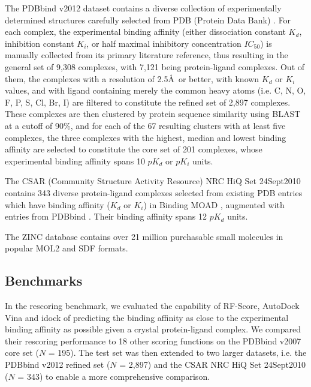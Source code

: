 The PDBbind v2012 dataset contains a diverse collection of experimentally determined structures carefully selected from PDB (Protein Data Bank) \citep{540,537}. For each complex, the experimental binding affinity (either dissociation constant $K_d$, inhibition constant $K_i$, or half maximal inhibitory concentration $IC_{50}$) is manually collected from its primary literature reference, thus resulting in the general set of 9,308 complexes, with 7,121 being protein-ligand complexes. Out of them, the complexes with a resolution of 2.5\AA\ or better, with known $K_d$ or $K_i$ values, and with ligand containing merely the common heavy atoms (i.e. C, N, O, F, P, S, Cl, Br, I) are filtered to constitute the refined set of 2,897 complexes. These complexes are then clustered by protein sequence similarity using BLAST at a cutoff of 90\%, and for each of the 67 resulting clusters with at least five complexes, the three complexes with the highest, median and lowest binding affinity are selected to constitute the core set of 201 complexes, whose experimental binding affinity spans 10 $pK_d$ or $pK_i$ units.

The CSAR (Community Structure Activity Resource) NRC HiQ Set 24Sept2010 contains 343 diverse protein-ligand complexes selected from existing PDB \citep{540,537} entries which have binding affinity ($K_d$ or $K_i$) in Binding MOAD \citep{517,518}, augmented with entries from PDBbind \citep{529,530}. Their binding affinity spans 12 $pK_d$ units.

The ZINC database contains over 21 million purchasable small molecules in popular MOL2 and SDF formats.

\subsection{Benchmarks}

In the rescoring benchmark, we evaluated the capability of RF-Score, AutoDock Vina and idock of predicting the binding affinity as close to the experimental binding affinity as possible given a crystal protein-ligand complex. We compared their rescoring performance to 18 other scoring functions on the PDBbind v2007 core set ($N$ = 195). The test set was then extended to two larger datasets, i.e. the PDBbind v2012 \citep{529,530} refined set ($N$ = 2,897) and the CSAR NRC HiQ Set 24Sept2010 ($N$ = 343) \citep{857,960} to enable a more comprehensive comparison.

